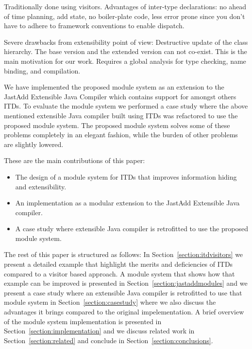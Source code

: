 Traditionally done using visitors. Advantages of inter-type declarations:
no ahead of time planning, add state, no boiler-plate code, less error
prone since you don't have to adhere to framework conventions to enable dispatch.

Severe drawbacks from extensibility point of view:
Destructive update of the class hierarchy. The base version and the
extended version can not co-exist. This is the main motivation for our
work. Requires a global analysis for type checking, name binding, and
compilation.

We have implemented the proposed module system as an extension to the
JastAdd Extensible Java Compiler which contains support for amongst others
ITDs. 
To evaluate the module system we performed a case study where the above
mentioned extensible Java compiler built using ITDs was refactored to use
the proposed module system.
The proposed module system solves some of these problems completely in an
elegant fashion, while the burden of other problems are slightly lowered.

These are the main contributions of this paper:
\begin{itemize}
\item The design of a module system for ITDs that improves information
hiding and extensibility.
\item An implementation as a modular extension to the JastAdd Extensible
Java compiler.
\item A case study where extensible Java compiler is retrofitted to use the
proposed module system.
\end{itemize}

The rest of this paper is structured as follows: In
Section~\ref{section:itdvisitors} we present a detailed example that
highlight the merits and deficiencies of ITDs compared to a visitor based
approach. A module system that shows how that example can be improved is
presented in Section~\ref{section:jastaddmodules} and we present a case
study where an extensible Java compiler is retrofitted to use that module
system in Section~\ref{section:casestudy} where we also discuss 
the advantages it brings compared to the original impelementation. A
brief overview of the module system implementation is presented in
Section~\ref{section:implementation} and we discuss related work in
Section~\ref{section:related} and conclude in
Section~\ref{section:conclusions}.

